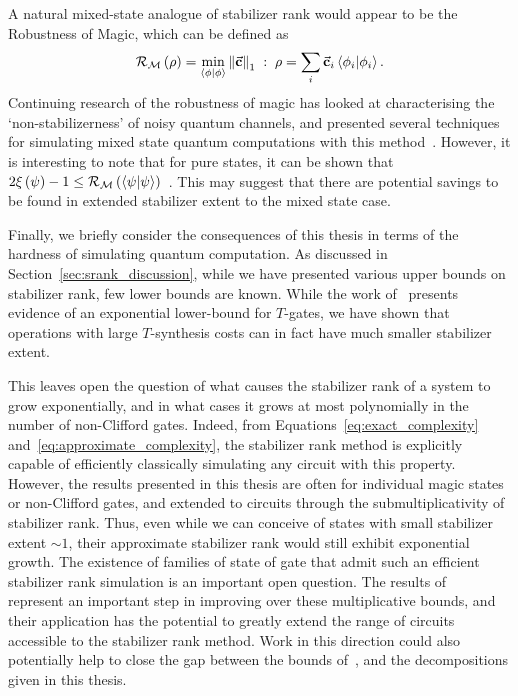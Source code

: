 A natural mixed-state analogue of stabilizer rank would appear to be the Robustness of Magic, which can be defined as~\cite{Howard2017}
\begin{equation}
\mathcal{R}_{\mathcal{M}}\left(\rho\right) = \min_{\braket{\phi}} \norm{\va{c}}_{1}\;:\; \rho = \sum_{i}\va{c}_{i}\braket{\phi_{i}}.
\end{equation}
Continuing research of the robustness of magic has looked at characterising the `non-stabilizerness' of noisy quantum channels, and presented several techniques for simulating mixed state quantum computations with this method~\cite{Seddon2019}. However, it is interesting to note that for pure states, it can be shown that $2 \xi\left(\psi\right) -1 \leq \mathcal{R}_{\mathcal{M}}\left(\braket{\psi}\right)$~\cite{Regula2018}. This may suggest that there are potential savings to be found in extended stabilizer extent to the mixed state case.\par
Finally, we briefly consider the consequences of this thesis in terms of the hardness of simulating quantum computation. As discussed in Section~\ref{sec:srank_discussion}, while we have presented various upper bounds on stabilizer rank, few lower bounds are known. While the work of~\cite{Dalzell2017} presents evidence of an exponential lower-bound for $T$-gates, we have shown that operations with large $T$-synthesis costs can in fact have much smaller stabilizer extent.\par
This leaves open the question of what causes the stabilizer rank of a system to grow exponentially, and in what cases it grows at most polynomially in the number of non-Clifford gates. Indeed, from Equations~\ref{eq:exact_complexity} and~\ref{eq:approximate_complexity}, the stabilizer rank method is explicitly capable of efficiently classically simulating any circuit with this property. However, the results presented in this thesis are often for individual magic states or non-Clifford gates, and extended to circuits through the submultiplicativity of stabilizer rank. Thus, even while we can conceive of states with small stabilizer extent $\sim 1$, their approximate stabilizer rank would still exhibit exponential growth. The existence of families of state of gate that admit such an efficient stabilizer rank simulation is an important open question. The results of~\cite{Qassim2019} represent an important step in improving over these multiplicative bounds, and their application has the potential to greatly extend the range of circuits accessible to the stabilizer rank method. Work in this direction could also potentially help to close the gap between the bounds of~\cite{Dalzell2017}, and the decompositions given in this thesis.